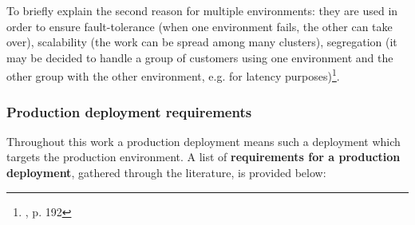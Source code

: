 To briefly explain the second reason for multiple environments: they are used in order to ensure fault-tolerance (when one environment fails, the other can take over), scalability (the work can be spread among many clusters), segregation (it may be decided to handle a group of customers using one environment and the other group with the other environment, e.g. for latency purposes)\footnote{\cite{book-iac}, p. 192}.

\subsubsection{Production deployment requirements}
\label{Production deployment requirements}
Throughout this work a production deployment means such a deployment which targets the production environment. A list of \textbf{requirements for a production deployment}, gathered through the literature, is provided below:
